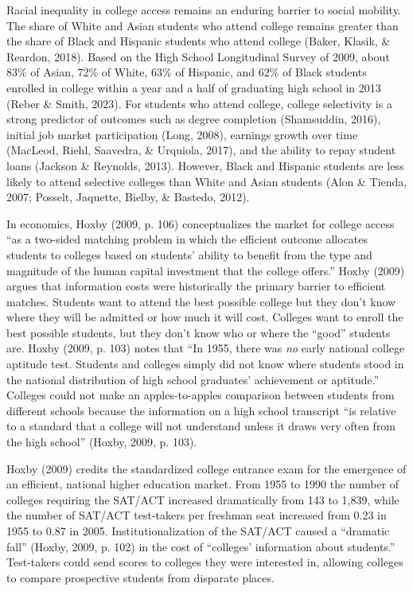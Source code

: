 \documentclass[
  12pt,
]{article}
\begin{document}
Racial inequality in college access remains an enduring barrier to social mobility. The share of White and Asian students who attend college remains greater than the share of Black and Hispanic students who attend college (Baker, Klasik, \& Reardon, 2018). Based on the High School Longitudinal Survey of 2009, about 83\% of Asian, 72\% of White, 63\% of Hispanic, and 62\% of Black students enrolled in college within a year and a half of graduating high school in 2013 (Reber \& Smith, 2023). For students who attend college, college selectivity is a strong predictor of outcomes such as degree completion (Shamsuddin, 2016), initial job market participation (Long, 2008), earnings growth over time (MacLeod, Riehl, Saavedra, \& Urquiola, 2017), and the ability to repay student loans (Jackson \& Reynolds, 2013). However, Black and Hispanic students are less likely to attend selective colleges than White and Asian students (Alon \& Tienda, 2007; Posselt, Jaquette, Bielby, \& Bastedo, 2012).

In economics, Hoxby (2009, p. 106) conceptualizes the market for college access ``as a two-sided matching problem in which the efficient outcome allocates students to colleges based on students' ability to benefit from the type and magnitude of the human capital investment that the college offers.'' Hoxby (2009) argues that information costs were historically the primary barrier to efficient matches. Students want to attend the best possible college but they don't know where they will be admitted or how much it will cost. Colleges want to enroll the best possible students, but they don't know who or where the ``good'' students are. Hoxby (2009, p. 103) notes that ``In 1955, there was \emph{no} early national college aptitude test. Students and colleges simply did not know where students stood in the national distribution of high school graduates' achievement or aptitude.'' Colleges could not make an apples-to-apples comparison between students from different schools because the information on a high school transcript ``is relative to a standard that a college will not understand unless it draws very often from the high school'' (Hoxby, 2009, p. 103).

Hoxby (2009) credits the standardized college entrance exam for the emergence of an efficient, national higher education market. From 1955 to 1990 the number of colleges requiring the SAT/ACT increased dramatically from 143 to 1,839, while the number of SAT/ACT test-takers per freshman seat increased from 0.23 in 1955 to 0.87 in 2005. Institutionalization of the SAT/ACT caused a ``dramatic fall'' (Hoxby, 2009, p. 102) in the cost of ``colleges' information about students.'' Test-takers could send scores to colleges they were interested in, allowing colleges to compare prospective students from disparate places.
\end{document}
